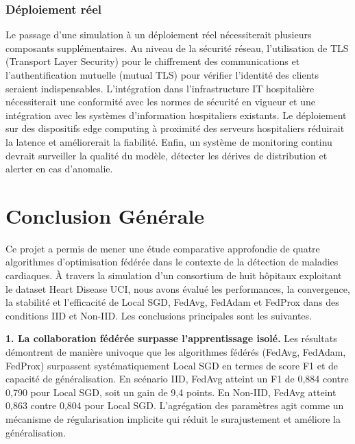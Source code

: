\documentclass[12pt,a4paper]{report}
\begin{document}
\subsection{D\'{e}ploiement r\'{e}el}

Le passage d'une simulation \`{a} un d\'{e}ploiement r\'{e}el n\'{e}cessiterait plusieurs composants suppl\'{e}mentaires. Au niveau de la s\'{e}curit\'{e} r\'{e}seau, l'utilisation de TLS (Transport Layer Security) pour le chiffrement des communications et l'authentification mutuelle (mutual TLS) pour v\'{e}rifier l'identit\'{e} des clients seraient indispensables. L'int\'{e}gration dans l'infrastructure IT hospitali\`{e}re n\'{e}cessiterait une conformit\'{e} avec les normes de s\'{e}curit\'{e} en vigueur et une int\'{e}gration avec les syst\`{e}mes d'information hospitaliers existants. Le d\'{e}ploiement sur des dispositifs edge computing \`{a} proximit\'{e} des serveurs hospitaliers r\'{e}duirait la latence et am\'{e}liorerait la fiabilit\'{e}. Enfin, un syst\`{e}me de monitoring continu devrait surveiller la qualit\'{e} du mod\`{e}le, d\'{e}tecter les d\'{e}rives de distribution et alerter en cas d'anomalie.

\chapter{Conclusion G\'{e}n\'{e}rale}

Ce projet a permis de mener une \'{e}tude comparative approfondie de quatre algorithmes d'optimisation f\'{e}d\'{e}r\'{e}e dans le contexte de la d\'{e}tection de maladies cardiaques. \`{A} travers la simulation d'un consortium de huit h\^{o}pitaux exploitant le dataset Heart Disease UCI, nous avons \'{e}valu\'{e} les performances, la convergence, la stabilit\'{e} et l'efficacit\'{e} de Local SGD, FedAvg, FedAdam et FedProx dans des conditions IID et Non-IID. Les conclusions principales sont les suivantes.

\textbf{1. La collaboration f\'{e}d\'{e}r\'{e}e surpasse l'apprentissage isol\'{e}.} Les r\'{e}sultats d\'{e}montrent de mani\`{e}re univoque que les algorithmes f\'{e}d\'{e}r\'{e}s (FedAvg, FedAdam, FedProx) surpassent syst\'{e}matiquement Local SGD en termes de score F1 et de capacit\'{e} de g\'{e}n\'{e}ralisation. En sc\'{e}nario IID, FedAvg atteint un F1 de 0,884 contre 0,790 pour Local SGD, soit un gain de 9,4 points. En Non-IID, FedAvg atteint 0,863 contre 0,804 pour Local SGD. L'agr\'{e}gation des param\`{e}tres agit comme un m\'{e}canisme de r\'{e}gularisation implicite qui r\'{e}duit le surajustement et am\'{e}liore la g\'{e}n\'{e}ralisation.
\end{document}
